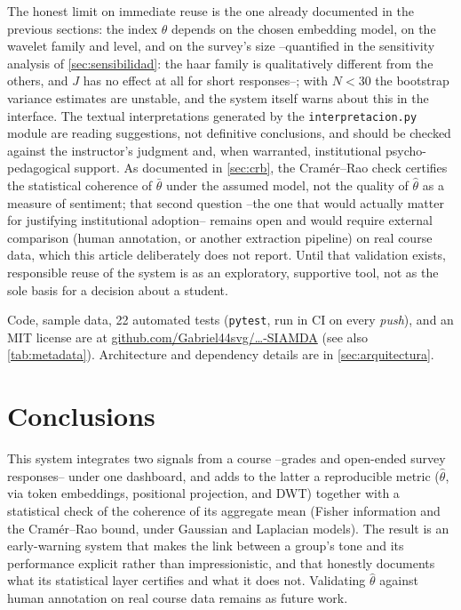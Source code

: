 \documentclass[11pt,a4paper,oneside]{article}
\theoremstyle{definition}
\begin{document}
The honest limit on immediate reuse is the one already documented in the previous sections: the
index $\hat\theta$ depends on the chosen embedding model, on the wavelet family and level, and on
the survey's size --quantified in the sensitivity analysis of \cref{sec:sensibilidad}: the haar
family is qualitatively different from the others, and $J$ has no effect at all for short
responses--; with $N<30$ the bootstrap variance estimates are unstable, and the system
itself warns about this in the interface. The textual interpretations generated by the
\texttt{interpretacion.py} module are reading suggestions, not definitive conclusions, and should
be checked against the instructor's judgment and, when warranted, institutional
psycho-pedagogical support. As documented in \cref{sec:crb}, the Cram\'er--Rao check certifies
the statistical coherence of $\bar\theta$ under the assumed model, not the quality of
$\hat\theta$ as a measure of sentiment; that second question --the one that would actually matter
for justifying institutional adoption-- remains open and would require external comparison
(human annotation, or another extraction pipeline) on real course data, which this article
deliberately does not report. Until that validation exists, responsible reuse of the system is
as an exploratory, supportive tool, not as the sole basis for a decision about a student.

\begin{implBox}[title=Reuse]
Code, sample data, 22 automated tests (\texttt{pytest}, run in CI on every \emph{push}), and an
MIT license are at
\href{https://github.com/Gabriel44svg/Galindo-C.-J.-y-Villafuerte-C.-G.-2026-.-SIAMDA}{github.com/Gabriel44svg/\ldots-SIAMDA}
(see also \cref{tab:metadata}). Architecture and dependency details are in \cref{sec:arquitectura}.
\end{implBox}

\section{Conclusions}

This system integrates two signals from a course --grades and open-ended survey responses--
under one dashboard, and adds to the latter a reproducible metric ($\hat\theta$, via token
embeddings, positional projection, and DWT) together with a statistical check of the coherence
of its aggregate mean (Fisher information and the Cram\'er--Rao bound, under Gaussian and
Laplacian models). The result is an early-warning system that makes the link between a group's
tone and its performance explicit rather than impressionistic, and that honestly documents what
its statistical layer certifies and what it does not. Validating $\hat\theta$ against human
annotation on real course data remains as future work.
\end{document}
